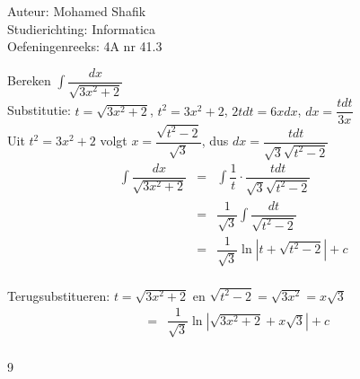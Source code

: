 \documentclass[a4paper]{article}
\begin{document}
\noindent \large Auteur: Mohamed Shafik \\
\noindent \large Studierichting: Informatica\\
\noindent \large Oefeningenreeks: 4A nr 41.3\\

\medskip

\normalsize

Bereken $\displaystyle\int \dfrac{dx}{\sqrt{3x^2+2}}$\\

Substitutie: $t = \sqrt{3x^2+2}$, $t^2 = 3x^2+2$, $2t dt = 6x dx$, $dx = \dfrac{t dt}{3x}$\\

Uit $t^2 = 3x^2 + 2$ volgt $x = \dfrac{\sqrt{t^2-2}}{\sqrt{3}}$, dus $dx = \dfrac{t dt}{\sqrt{3}\sqrt{t^2-2}}$\\

\begin{eqnarray*}
\displaystyle\int \dfrac{dx}{\sqrt{3x^2+2}} &=& \displaystyle\int \dfrac{1}{t} \cdot \dfrac{t dt}{\sqrt{3}\sqrt{t^2-2}}\\
&=& \dfrac{1}{\sqrt{3}} \displaystyle\int \dfrac{dt}{\sqrt{t^2-2}}\\
&=& \dfrac{1}{\sqrt{3}} \ln\left|t + \sqrt{t^2-2}\right| + c\\
\end{eqnarray*}

Terugsubstitueren: $t = \sqrt{3x^2+2}$ en $\sqrt{t^2-2} = \sqrt{3x^2} = x\sqrt{3}$\\

\begin{eqnarray*}
&=& \dfrac{1}{\sqrt{3}} \ln\left|\sqrt{3x^2+2} + x\sqrt{3}\right| + c\\
\end{eqnarray*}

\begin{thebibliography}{9}
\end{thebibliography}
\end{document}
